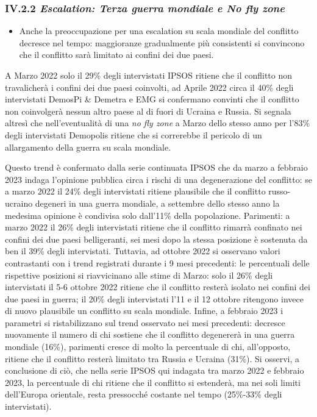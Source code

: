 \documentclass[
  openany]{book}
\providecommand{\tightlist}{%
  \setlength{\itemsep}{0pt}\setlength{\parskip}{0pt}}
\begin{document}
\hypertarget{iv.2.2-escalation-terza-guerra-mondiale-e-no-fly-zone}{%
\subsubsection{\texorpdfstring{IV.2.2 \emph{Escalation: Terza guerra mondiale e No fly zone}}{IV.2.2 Escalation: Terza guerra mondiale e No fly zone}}\label{iv.2.2-escalation-terza-guerra-mondiale-e-no-fly-zone}}

\begin{itemize}
\tightlist
\item
  Anche la preoccupazione per una escalation su scala mondiale del conflitto decresce nel tempo: maggioranze gradualmente più consistenti si convincono che il conflitto sarà limitato ai confini dei due paesi.
\end{itemize}

A Marzo 2022 solo il 29\% degli intervistati IPSOS ritiene che il conflitto non travalicherà i confini dei due paesi coinvolti, ad Aprile 2022 circa il 40\% degli intervistati DemosPi \& Demetra e EMG si confermano convinti che il conflitto non coinvolgerà nessun altro paese al di fuori di Ucraina e Russia. Si segnala altresì che nell'eventualità di una \emph{no fly zone} a Marzo dello stesso anno per l'83\% degli intervistati Demopolis ritiene che si correrebbe il pericolo di un allargamento della guerra su scala mondiale.

Questo trend è confermato dalla serie continuata IPSOS che da marzo a febbraio 2023 indaga l'opinione pubblica circa i rischi di una degenerazione del conflitto: se a marzo 2022 il 24\% degli intervistati ritiene plausibile che il conflitto russo-ucraino degeneri in una guerra mondiale, a settembre dello stesso anno la medesima opinione è condivisa solo dall'11\% della popolazione. Parimenti: a marzo 2022 il 26\% degli intervistati ritiene che il conflitto rimarrà confinato nei confini dei due paesi belligeranti, sei mesi dopo la stessa posizione è sostenuta da ben il 39\% degli intervistati. Tuttavia, ad ottobre 2022 si osservano valori contrastanti con i trend registrati durante i 9 mesi precedenti: le percentuali delle rispettive posizioni si riavvicinano alle stime di Marzo: solo il 26\% degli intervistati il 5-6 ottobre 2022 ritiene che il conflitto resterà isolato nei confini dei due paesi in guerra; il 20\% degli intervistati l'11 e il 12 ottobre ritengono invece di nuovo plausibile un conflitto su scala mondiale. Infine, a febbraio 2023 i parametri si ristabilizzano sul trend osservato nei mesi precedenti: decresce nuovamente il numero di chi sostiene che il conflitto degenererà in una guerra mondiale (16\%), parimenti cresce di molto la percentuale di chi, all'opposto, ritiene che il conflitto resterà limitato tra Russia e Ucraina (31\%). Si osservi, a conclusione di ciò, che nella serie IPSOS qui indagata tra marzo 2022 e febbraio 2023, la percentuale di chi ritiene che il conflitto si estenderà, ma nei soli limiti dell'Europa orientale, resta pressocché costante nel tempo (25\%-33\% degli intervistati).
\end{document}
